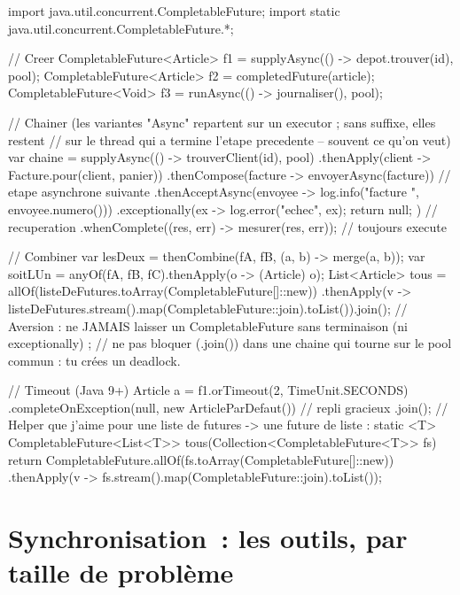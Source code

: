 \begin{codejava}
import java.util.concurrent.CompletableFuture;
import static java.util.concurrent.CompletableFuture.*;

// Creer
CompletableFuture<Article> f1 = supplyAsync(() -> depot.trouver(id), pool);
CompletableFuture<Article> f2 = completedFuture(article);
CompletableFuture<Void> f3 = runAsync(() -> journaliser(), pool);

// Chainer (les variantes "Async" repartent sur un executor ; sans suffixe, elles restent
// sur le thread qui a termine l'etape precedente -- souvent ce qu'on veut)
var chaine = supplyAsync(() -> trouverClient(id), pool)
        .thenApply(client -> Facture.pour(client, panier))
        .thenCompose(facture -> envoyerAsync(facture))            // etape asynchrone suivante
        .thenAcceptAsync(envoyee -> log.info("facture {}", envoyee.numero()))
        .exceptionally(ex -> { log.error("echec", ex); return null; })   // recuperation
        .whenComplete((res, err) -> mesurer(res, err));                    // toujours execute

// Combiner
var lesDeux = thenCombine(fA, fB, (a, b) -> merge(a, b));
var soitLUn = anyOf(fA, fB, fC).thenApply(o -> (Article) o);
List<Article> tous = allOf(listeDeFutures.toArray(CompletableFuture[]::new))
        .thenApply(v -> listeDeFutures.stream().map(CompletableFuture::join).toList()).join();
// Aversion : ne JAMAIS laisser un CompletableFuture sans terminaison (ni exceptionally) ;
// ne pas bloquer (.join()) dans une chaine qui tourne sur le pool commun : tu cr\'ees un deadlock.

// Timeout (Java 9+)
Article a = f1.orTimeout(2, TimeUnit.SECONDS)
              .completeOnException(null, new ArticleParDefaut())   // repli gracieux
              .join();
// Helper que j'aime pour une liste de futures -> une future de liste :
static <T> CompletableFuture<List<T>> tous(Collection<CompletableFuture<T>> fs) {
    return CompletableFuture.allOf(fs.toArray(CompletableFuture[]::new))
            .thenApply(v -> fs.stream().map(CompletableFuture::join).toList());
}
\end{codejava}

\section{Synchronisation~: les outils, par taille de probl\`eme}

